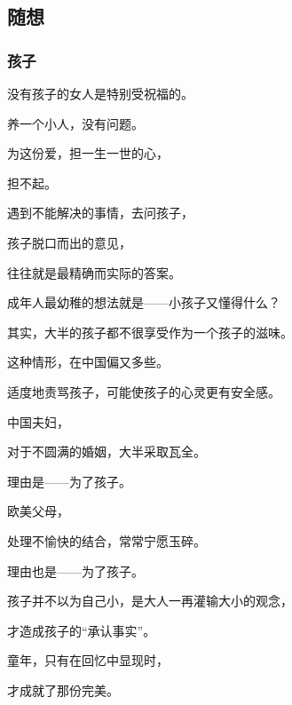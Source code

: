 \subsubsection{}




















\subsection{随想}



\subsubsection{孩子}


\par 没有孩子的女人是特别受祝福的。
\par 养一个小人，没有问题。
\par 为这份爱，担一生一世的心，
\par 担不起。
\par 
\par 遇到不能解决的事情，去问孩子，
\par 孩子脱口而出的意见，
\par 往往就是最精确而实际的答案。
\par 
\par 成年人最幼稚的想法就是——小孩子又懂得什么？
\par 其实，大半的孩子都不很享受作为一个孩子的滋味。
\par 这种情形，在中国偏又多些。
\par 
\par 适度地责骂孩子，可能使孩子的心灵更有安全感。
\par 
\par 中国夫妇，
\par 对于不圆满的婚姻，大半采取瓦全。
\par 理由是——为了孩子。
\par 欧美父母，
\par 处理不愉快的结合，常常宁愿玉碎。
\par 理由也是——为了孩子。
\par 
\par 孩子并不以为自己小，是大人一再灌输大小的观念，
\par 才造成孩子的“承认事实”。
\par 
\par 童年，只有在回忆中显现时，
\par 才成就了那份完美。


